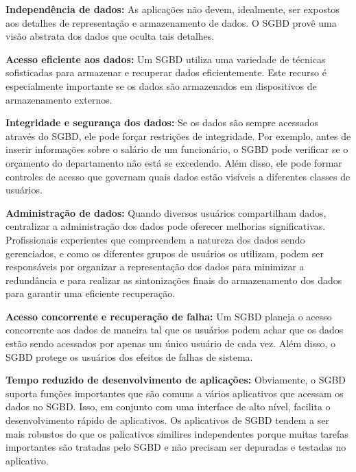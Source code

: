 \begin{compactitem}
    \item \textbf{Independência de dados:} As aplicações não devem, idealmente, ser expostos aos detalhes de representação e armazenamento de dados. O SGBD provê uma visão abstrata dos dados que oculta tais detalhes. 
    
    \item \textbf{Acesso eficiente aos dados:} Um SGBD utiliza uma variedade de técnicas sofisticadas para armazenar e recuperar dados eficientemente. Este recurso é especialmente importante se os dados são armazenados em dispositivos de armazenamento externos. 
    
    \item \textbf{Integridade e segurança dos dados:} Se os dados são sempre acessados através do SGBD, ele pode forçar restrições de integridade. Por exemplo, antes de inserir informações sobre o salário de um funcionário, o SGBD pode verificar se o orçamento do departamento não está se excedendo. Além disso, ele pode formar controles de acesso que governam quais dados estão visíveis a diferentes classes de usuários. 
    
    \item \textbf{Administração de dados:} Quando diversos usuários compartilham dados, centralizar a administração dos dados pode oferecer melhorias significativas. Profissionais experientes que compreendem a natureza dos dados sendo gerenciados, e como os diferentes grupos de usuários os utilizam, podem ser responsáveis por organizar a representação dos dados para minimizar a redundância e para realizar as sintonizações finais do armazenamento dos dados para garantir uma eficiente recuperação. 
    
    \item \textbf{Acesso concorrente e recuperação de falha:} Um SGBD planeja o acesso concorrente aos dados de maneira tal que os usuários podem achar que os dados estão sendo acessados por apenas um único usuário de cada vez. Além disso, o SGBD protege os usuários dos efeitos de falhas de sistema. 
    
    \item \textbf{Tempo reduzido de desenvolvimento de aplicações:} Obviamente, o SGBD suporta funções importantes que são comuns a vários aplicativos que acessam os dados no SGBD. Isso, em conjunto com uma interface de alto nível, facilita o desenvolvimento rápido de aplicativos. Os aplicativos de SGBD tendem a ser mais robustos do que os palicativos similires independentes porque muitas tarefas importantes são tratadas pelo SGBD e não precisam ser depuradas e testadas no aplicativo. 
\end{compactitem}

